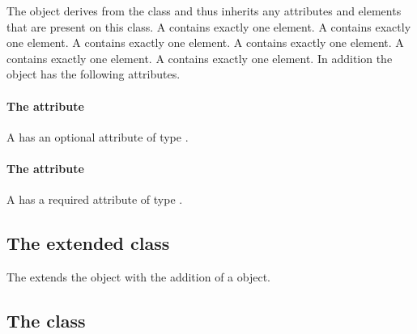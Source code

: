 The \Geometry object derives from the \SBase class and thus inherits any
attributes and elements that are present on this class.
A \Geometry contains exactly one \ListOfCoordinateComponents element.
A \Geometry contains exactly one \ListOfDomainTypes element.
A \Geometry contains exactly one \ListOfDomains element.
A \Geometry contains exactly one \ListOfAdjacentDomains element.
A \Geometry contains exactly one \ListOfGeometryDefinitions element.
A \Geometry contains exactly one \ListOfSampledFields element.
In addition the \Geometry object has the following attributes.

\paragraph{The \fixttspace{} attribute}

A \Geometry has an optional attribute  of type .


\paragraph{The \fixttspace{} attribute}

A \Geometry has a required attribute  of type
.


\subsection{The extended  class}
\label{extended-compartment-class}




The \SpatialProcessesPackage extends the  object with
the addition of
a \CompartmentMapping object.

\subsection{The  class}
\label{compartmentmapping-class}

